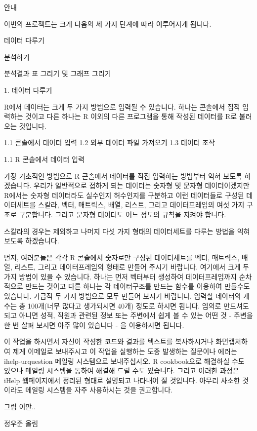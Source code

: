 안내

이번의 프로젝트는 크게 다음의 세 가지 단계에 따라 이루어지게 됩니다.

데이터 다루기

분석하기

분석결과 표 그리기 및 그래프 그리기

1.  데이터 다루기

R에서 데이터는 크게 두 가지 방법으로 입력될 수 있습니다. 하나는 콘솔에서 집적 입력하는 것이고 다른 하나는 R 이외의 다른 프로그램을 통해 작성된 데이터를 R로 불러오는 것입니다.

1.1 콘솔에서 데이터 입력
1.2 외부 데이터 파일 가져오기
1.3 데이터 조작

1.1 R 콘솔에서 데이터 입력

가장 기초적인 방법으로 R 콘솔에서 데이터를 직접 입력하는 방법부터 익혀 보도록 하겠습니다. 우리가 일반적으로 접하게 되는 데이터는 숫자형 및 문자형 데이터이겠지만 R에서는 숫자형 데이터라도 실수인지 허수인지를 구분하고 이런 데이터들로 구성된 데이터세트를 스칼라, 벡터, 매트릭스, 배열, 리스트, 그리고 데이터프레임의 여섯 가지 구조로 구분합니다. 그리고 문자형 데이터도 어느 정도의 규칙을 지켜야 합니다.

스칼라의 경우는 제외하고 나머지 다섯 가지 형태의 데이터세트를 다루는 방법을 익혀 보도록 하겠습니다.

먼저, 여러분들은 각각 R 콘솔에서 숫자로만 구성된 데이터세트를 벡터, 매트릭스, 배열, 리스트, 그리고 데이터프레임의 형태로 만들어 주시기 바랍니다. 여기에서 크게 두 가지 방법이 있을 수 있습니다. 하나는 먼저 벡터부터 생성하여 데이터프레임까지 순차적으로 만드는 것이고 다른 하나는 각 데이터구조를 만드는 함수를 이용하여 만들수도 있습니다. 가급적 두 가지 방법으로 모두 만들어 보시기 바랍니다. 입력할 데이터의 개수는 총 100개(너무 많다고 생가되시면 40개) 정도로 하시면 됩니다. 임의로 만드셔도 되고 아니면 성적, 직원과 관련된 정보 또는 주변에서 쉽게 볼 수 있는 어떤 것 - 주변을 한 번 살펴 보시면 아주 많이 있습니다 - 을 이용하시면 됩니다.

이 작업을 하시면서 자신이 작성한 코드와 결과를 텍스트를 복사하시거나 화면캡쳐하여 제게 이메일로 보내주시고 이 작업을 실행하는 도중 발생하는 질문이나 에러는 ihelp-urquestion 메일링 시스템으로 보내주십시오. R cookbook으로 해결하실 수도 있으나 메일링 시스템을 통하여 해결해 드릴 수도 있습니다. 그리고 이러한 과정은 iHelp 웹페이지에서 정리된 형태로 설명되고 나타내어 질 것입니다. 아무리 사소한 것이라도 메일링 시스템을 자주 사용하시는 것을 권고합니다.




그럼 이만..

정우준 올림
